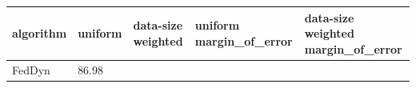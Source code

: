 \begin{tabular}{lllll}
\toprule
algorithm & uniform & data-size weighted & uniform margin_of_error & data-size weighted margin_of_error \\
\midrule
FedDyn & 86.98%
\bottomrule
\end{tabular}

